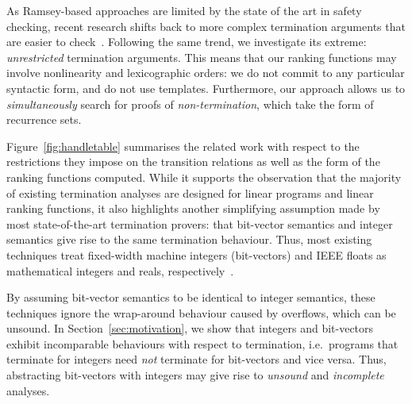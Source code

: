 \documentclass[a4paper]{llncs}
\begin{document}
As Ramsey-based approaches are limited by the state of the art in safety
checking, recent research shifts back to more complex termination arguments
that are easier to
check~\cite{DBLP:conf/cav/KroeningSTW10,DBLP:conf/tacas/CookSZ13}. 
Following the same trend, we investigate its extreme: \emph{unrestricted}
termination arguments.  This means that our ranking functions may involve
nonlinearity and lexicographic orders: we do not commit to any particular
syntactic form, and do not use templates.  Furthermore, our approach allows
us to \emph{simultaneously} search for proofs of \emph{non-termination},
which take the form of recurrence sets.

Figure~\ref{fig:handletable} summarises the related work with respect to the
restrictions they impose on the transition relations as well as the form of
the ranking functions computed.  While it supports the observation that the
majority of existing termination analyses are designed for linear programs
and linear ranking functions, it also highlights another simplifying
assumption made by most state-of-the-art termination provers: that
bit-vector semantics and integer semantics give rise to the same termination
behaviour.  Thus, most existing techniques treat fixed-width machine integers
(bit-vectors) and IEEE floats as mathematical integers and reals,
respectively~\cite{DBLP:conf/pldi/CookPR06,DBLP:conf/popl/Ben-AmramG13,DBLP:conf/vmcai/P04,DBLP:conf/atva/HeizmannHLP13,DBLP:conf/vmcai/BradleyMS05,DBLP:conf/cav/KroeningSTW10}.

By assuming bit-vector semantics to be identical to integer semantics, these
techniques ignore the wrap-around behaviour caused by overflows, which can
be unsound.  In Section~\ref{sec:motivation}, we show that integers and
bit-vectors exhibit incomparable behaviours with respect to termination,
i.e.~programs that terminate for integers need \emph{not} terminate for
bit-vectors and vice versa.  Thus, abstracting bit-vectors with integers may
give rise to {\em unsound} and {\em incomplete} analyses.

\end{document}
